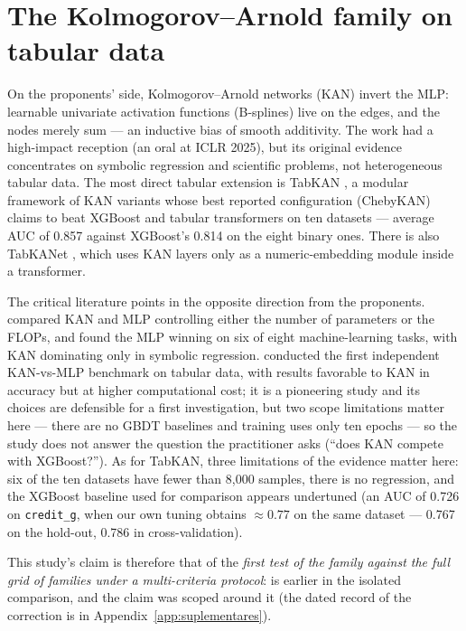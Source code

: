 \section{The Kolmogorov--Arnold family on tabular data}
\label{sec:rel-kan}

On the proponents' side, Kolmogorov--Arnold networks (KAN)
\citep{kan2024} invert the MLP: learnable univariate activation
functions (B-splines) live on the edges, and the nodes merely sum
--- an inductive bias of smooth additivity. The work had a
high-impact reception (an oral at ICLR 2025), but its original
evidence concentrates on symbolic regression and scientific
problems, not heterogeneous tabular data. The most direct tabular
extension is TabKAN \citep{tabkan2025}, a modular framework of KAN
variants whose best reported configuration (ChebyKAN) claims to beat
XGBoost and tabular transformers on ten datasets --- average AUC of
0.857 against XGBoost's 0.814 on the eight binary ones. There is
also TabKANet \citep{tabkanet2024}, which uses KAN layers only as a
numeric-embedding module inside a transformer.

The critical literature points in the opposite direction from the
proponents. \citet{kancritical2024} compared KAN and MLP controlling
either the number of parameters or the FLOPs, and found the MLP
winning on six of eight machine-learning tasks, with KAN dominating
only in symbolic regression. \citet{poeta2024} conducted the first
independent KAN-vs-MLP benchmark on tabular data, with results
favorable to KAN in accuracy but at higher computational cost; it
is a pioneering study and its choices are defensible for a first
investigation, but two scope limitations matter here --- there are
no GBDT baselines and training uses only ten epochs --- so the
study does not answer the question the practitioner asks (``does
KAN compete with XGBoost?''). As for TabKAN, three limitations of
the evidence matter here: six of the ten datasets have fewer than
8{,}000 samples, there is no regression, and the XGBoost baseline
used for comparison appears undertuned (an AUC of 0.726 on \texttt{credit\_g},
when our own tuning obtains ${\approx}0.77$ on the same dataset ---
0.767 on the hold-out, 0.786 in cross-validation).

This study's claim is therefore that of the \emph{first test of the
family against the full grid of families under a multi-criteria
protocol}: \citet{poeta2024} is earlier in the isolated comparison,
and the claim was scoped around it (the dated record of the
correction is in Appendix~\ref{app:suplementares}).

